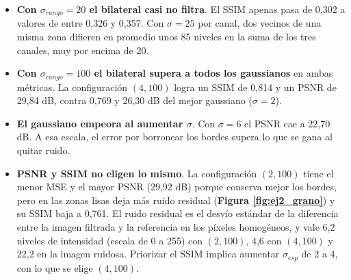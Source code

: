         \begin{itemize}[label=\textbullet]
            \item \textbf{Con $\sigma_{rango}=20$ el bilateral casi no filtra}. El SSIM apenas pasa de 0,302 a valores de entre 0,326 y 0,357. Con $\sigma=25$ por canal, dos vecinos de una misma zona difieren en promedio unos 85 niveles en la suma de los tres canales, muy por encima de 20.
            \item \textbf{Con $\sigma_{rango}=100$ el bilateral supera a todos los gaussianos} en ambas métricas. La configuración $(4, 100)$ logra un SSIM de 0,814 y un PSNR de 29,84 dB, contra 0,769 y 26,30 dB del mejor gaussiano ($\sigma=2$).
            \item \textbf{El gaussiano empeora al aumentar $\sigma$}. Con $\sigma=6$ el PSNR cae a 22,70 dB. A esa escala, el error por borronear los bordes supera lo que se gana al quitar ruido.
            \item \textbf{PSNR y SSIM no eligen lo mismo}. La configuración $(2, 100)$ tiene el menor MSE y el mayor PSNR (29,92 dB) porque conserva mejor los bordes, pero en las zonas lisas deja más ruido residual (\textbf{Figura \ref{fig:ej2_grano}}) y su SSIM baja a 0,761. El ruido residual es el desvío estándar de la diferencia entre la imagen filtrada y la referencia en los píxeles homogéneos, y vale 6,2 niveles de intensidad (escala de 0 a 255) con $(2, 100)$, 4,6 con $(4, 100)$ y 22,2 en la imagen ruidosa. Priorizar el SSIM implica aumentar $\sigma_{esp}$ de 2 a 4, con lo que se elige $(4, 100)$.
        \end{itemize}

